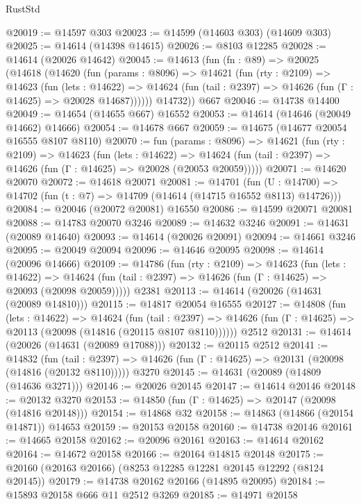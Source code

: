 \begin{lexlean}{RustStd}
\begin{coremodule}
@20019 := @14597 @303
@20023 := @14599 (@14603 @303) (@14609 @303)
@20025 := @14614 (@14398 @14615)
@20026 := @8103 @12285
@20028 := @14614 (@20026 @14642)
@20045 := @14613
    (fun (fn : @89) =>
    @20025
      (@14618
        (@14620
          (fun (params : @8096) =>
          @14621
            (fun (rty : @2109) =>
            @14623
              (fun (lets : @14622) =>
              @14624 (fun (tail : @2397) => @14626 (fun (Γ : @14625) => @20028 @14687))))))
        @14732))
    @667
@20046 := @14738 @14400
@20049 := @14654 (@14655 @667) @16552
@20053 := @14614 (@14646 (@20049 @14662) @14666)
@20054 := @14678 @667
@20059 := @14675 (@14677 @20054 @16555 @8107 @8110)
@20070 := fun (params : @8096) =>
  @14621
    (fun (rty : @2109) =>
    @14623
      (fun (lets : @14622) =>
      @14624 (fun (tail : @2397) => @14626 (fun (Γ : @14625) => @20028 (@20053 @20059)))))
@20071 := @14620 @20070
@20072 := @14618 @20071
@20081 := @14701
    (fun (U : @14700) => @14702 (fun (t : @7) => @14709 (@14614 (@14715 @16552 @8113) @14726)))
@20084 := @20046 (@20072 @20081) @16550
@20086 := @14599 @20071 @20081
@20088 := @14783 @20070 @3246
@20089 := @14632 @3246
@20091 := @14631 (@20089 @14640)
@20093 := @14614 (@20026 @20091)
@20094 := @14661 @3246
@20095 := @20049 @20094
@20096 := @14646 @20095
@20098 := @14614 (@20096 @14666)
@20109 := @14786
    (fun (rty : @2109) =>
    @14623
      (fun (lets : @14622) =>
      @14624 (fun (tail : @2397) => @14626 (fun (Γ : @14625) => @20093 (@20098 @20059)))))
    @2381
@20113 := @14614 (@20026 (@14631 (@20089 @14810)))
@20115 := @14817 @20054 @16555
@20127 := @14808
    (fun (lets : @14622) =>
    @14624
      (fun (tail : @2397) =>
      @14626 (fun (Γ : @14625) => @20113 (@20098 (@14816 (@20115 @8107 @8110))))))
    @2512
@20131 := @14614 (@20026 (@14631 (@20089 @17088)))
@20132 := @20115 @2512
@20141 := @14832
    (fun (tail : @2397) => @14626 (fun (Γ : @14625) => @20131 (@20098 (@14816 (@20132 @8110)))))
    @3270
@20145 := @14631 (@20089 (@14809 (@14636 @3271)))
@20146 := @20026 @20145
@20147 := @14614 @20146
@20148 := @20132 @3270
@20153 := @14850 (fun (Γ : @14625) => @20147 (@20098 (@14816 @20148)))
@20154 := @14868 @32
@20158 := @14863 (@14866 (@20154 @14871)) @14653
@20159 := @20153 @20158
@20160 := @14738 @20146
@20161 := @14665 @20158
@20162 := @20096 @20161
@20163 := @14614 @20162
@20164 := @14672 @20158
@20166 := @20164 @14815 @20148
@20175 := @20160 (@20163 @20166) (@8253 @12285 @12281 @20145 @12292 (@8124 @20145))
@20179 := @14738 @20162 @20166 (@14895 @20095)
@20184 := @15893 @20158 @666 @11 @2512 @3269
@20185 := @14971 @20158

\end{coremodule}
\end{lexlean}

